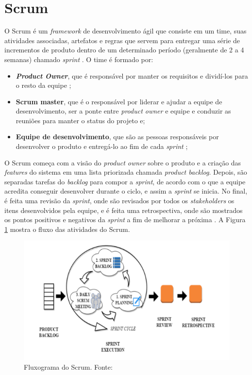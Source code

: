 \section{Scrum}

O Scrum é um \textit{framework} de desenvolvimento ágil que consiste em um time, suas atividades associadas, artefatos e regras que servem para entregar uma série de incrementos de produto dentro de um determinado período (geralmente de 2 a 4 semanas) chamado \textit{sprint} \cite{livro-scrum}.
O time é formado por:
\begin{itemize}
\item \textbf{\textit{Product Owner}}, que é responsável por manter os requisitos e dividí-los para o resto da equipe \cite{product-owner};
\item \textbf{Scrum master}, que é o responsável por liderar e ajudar a equipe de desenvolvimento, ser a ponte entre \textit{product owner} e equipe e conduzir as reuniões para manter o status do projeto \cite{scrum-master} e;
\item \textbf{Equipe de desenvolvimento}, que são as pessoas responsáveis por desenvolver o produto e entregá-lo ao fim de cada \textit{sprint} \cite{equipe-dev};
\end{itemize}
O Scrum começa com a visão do \textit{product owner} sobre o produto e a criação das \textit{features} do sistema em uma lista priorizada chamada \textit{product backlog}. Depois, são separadas tarefas do \textit{backlog} para compor a \textit{sprint}, de acordo com o que a equipe acredita conseguir desenvolver durante o ciclo, e assim a \textit{sprint} se inicia. No final, é feita uma revisão da \textit{sprint}, onde são revisados por todos os \textit{stakeholders} os itens desenvolvidos pela equipe, e é feita uma retrospectiva, onde são mostrados os pontos positivos e negativos da \textit{sprint} a fim de melhorar a próxima \cite{livro-scrum}. A Figura \ref{img:scrum} mostra o fluxo das atividades do Scrum.

\begin{figure}[H]
    \centering
    \includegraphics[scale=0.5]{figuras/scrum.png}
    \caption[Fluxograma do Scrum]{Fluxograma do Scrum. Fonte: \cite{artigo-scrum}}
    \label{img:scrum}
\end{figure}
